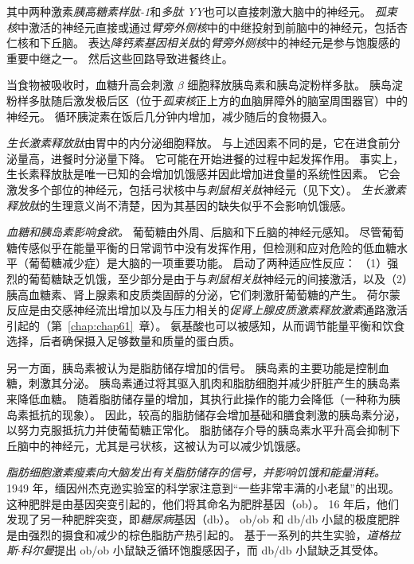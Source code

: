 其中两种激素\textit{胰高糖素样肽-1}和\textit{多肽 YY}也可以直接刺激大脑中的神经元。
\textit{孤束核}中激活的神经元直接或通过\textit{臂旁外侧核}中的中继投射到前脑中的神经元，包括杏仁核和下丘脑。
表达\textit{降钙素基因相关肽}的\textit{臂旁外侧核}中的神经元是参与饱腹感的重要中继之一。
然后这些回路导致进餐终止。


当食物被吸收时，血糖升高会刺激 $ \beta $ 细胞释放胰岛素和胰岛淀粉样多肽。
胰岛淀粉样多肽随后激发极后区（位于\textit{孤束核}正上方的血脑屏障外的脑室周围器官）中的神经元。
循环胰淀素在饭后几分钟内增加，减少随后的食物摄入。


\textit{生长激素释放肽}由胃中的内分泌细胞释放。
与上述因素不同的是，它在进食前分泌量高，进餐时分泌量下降。
它可能在开始进餐的过程中起发挥作用。
事实上，生长素释放肽是唯一已知的会增加饥饿感并因此增加进食量的系统性因素。
它会激发多个部位的神经元，包括弓状核中与\textit{刺鼠相关肽}神经元（见下文）。
\textit{生长激素释放肽}的生理意义尚不清楚，因为其基因的缺失似乎不会影响饥饿感。


\textit{血糖和胰岛素影响食欲。}
葡萄糖由外周、后脑和下丘脑的神经元感知。
尽管葡萄糖传感似乎在能量平衡的日常调节中没有发挥作用，但检测和应对危险的低血糖水平（葡萄糖减少症）是大脑的一项重要功能。
启动了两种适应性反应：
（1）强烈的葡萄糖缺乏饥饿，至少部分是由于与\textit{刺鼠相关肽}神经元的间接激活，以及（2）胰高血糖素、肾上腺素和皮质类固醇的分泌，它们刺激肝葡萄糖的产生。
荷尔蒙反应是由交感神经流出增加以及与压力相关的\textit{促肾上腺皮质激素释放激素}通路激活引起的（第~\ref{chap:chap61}~章）。
氨基酸也可以被感知，从而调节能量平衡和饮食选择，后者确保摄入足够数量和质量的蛋白质。


另一方面，胰岛素被认为是脂肪储存增加的信号。
胰岛素的主要功能是控制血糖，刺激其分泌。
胰岛素通过将其驱入肌肉和脂肪细胞并减少肝脏产生的胰岛素来降低血糖。
随着脂肪储存量的增加，其执行此操作的能力会降低（一种称为胰岛素抵抗的现象）。
因此，较高的脂肪储存会增加基础和膳食刺激的胰岛素分泌，以努力克服抵抗力并使葡萄糖正常化。
脂肪储存介导的胰岛素水平升高会抑制下丘脑中的神经元，尤其是弓状核，这被认为可以减少饥饿感。


\textit{脂肪细胞激素瘦素向大脑发出有关脂肪储存的信号，并影响饥饿和能量消耗。}
1949 年，缅因州杰克逊实验室的科学家注意到“一些非常丰满的小老鼠”的出现。
这种肥胖是由基因突变引起的，他们将其命名为肥胖基因（ob）。
16 年后，他们发现了另一种肥胖突变，即\textit{糖尿病}基因（db）。
ob/ob 和 db/db 小鼠的极度肥胖是由强烈的摄食和减少的棕色脂肪产热引起的。
基于一系列的共生实验，\textit{道格拉斯$\cdot$科尔曼}提出 ob/ob 小鼠缺乏循环饱腹感因子，而 db/db 小鼠缺乏其受体。


